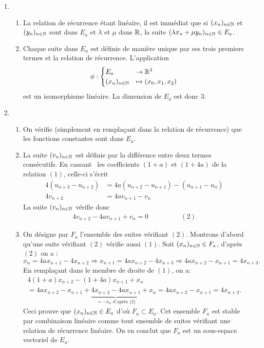 \begin{enumerate}
 \item \begin{enumerate}
 \item La relation de récurrence étant linéaire, il est immédiat que si $(x_n)_{n\in\mathbb{N}}$ et $(y_n)_{n\in\mathbb{N}}$ sont dans $E_a$ et $\lambda$ et $\mu$ dans $\mathbb{R}$, la suite $(\lambda x_n + \mu y_n)_{n\in\mathbb{N}} \in E_a$.
\item Chaque suite dans $E_a$ est définie de manière unique par ses trois premiers termes et la relation de  récurrence. L'application
\begin{displaymath}
 \phi : \begin{cases}E_a &\rightarrow \mathbb{R}^3 \\ (x_n)_{n\in\mathbb{N}} &\mapsto (x_0,x_1,x_2) \end{cases}
\end{displaymath}
est un isomorphisme linéaire. La dimension de $E_a$ est donc $3$.
\end{enumerate}
\item \begin{enumerate}
 \item On vérifie (simplement en remplaçant dans la relation de récurrence) que les fonctions constantes sont dans $E_a$.
\item La suite $(v_n)_{n\in\mathbb{N}}$ est définie par la différence entre deux termes consécutifs. En \og cassant\fg~ les coefficients $(1+a)$ et $(1+4a)$ de la relation $(1)$, celle-ci s'écrit
\begin{align*}
 4(u_{n+3}-u_{n+2}) &= 4a(u_{n+2}-u_{n+1}) -(u_{n+1}-u_n) \\
4v_{n+2} &= 4a v_{n+1}-v_n
\end{align*}
La suite $(v_n)_{n\in\mathbb{N}}$ vérifie donc
\begin{align*}
 4v_{n+2}-4av_{n+1}+v_n= 0 \hspace{2cm}(2)
\end{align*}
\item On désigne par $F_a$ l'ensemble des suites vérifiant $(2)$. Montrons d'abord qu'une suite vérifiant $(2)$ vérifie aussi $(1)$.\newline
Soit $(x_n)_{n\in\mathbb{N}}\in F_a$, d'après $(2)$ on a :
\[
 x_n = 4ax_{n+1}-4x_{n+2} 
 \Rightarrow x_{n+1} = 4a x_{n+2} - 4x_{n+3}
 \Rightarrow 4ax_{n+2}-x_{n+1} = 4x_{n+3}.
\]
En remplaçant dans le membre de droite de $(1)$, on a:
\begin{multline*}
4(1+a)x_{n+2}-(1+4a)x_{n+1}+x_n \\ 
= 4ax_{n+2}-x_{n+1}+ \underset{= -x_n \text{ d'après (2)}}{\underbrace{4x_{n+2}-4ax_{n+1}}} + x_n  
= 4ax_{n+2}-x_{n+1} = 4x_{n+3}.
\end{multline*}
Ceci prouve que $(x_n)_{n\in\mathbb{N}} \in E_a$ d'où $F_a\subset E_a$. Cet ensemble $F_a$ est stable par combinaison linéaire comme tout ensemble de suites vérifiant une relation de récurrence linéaire. On en conclut que $F_a$ est un sous-espace vectoriel de $E_a$.


\end{enumerate}
\end{enumerate}
